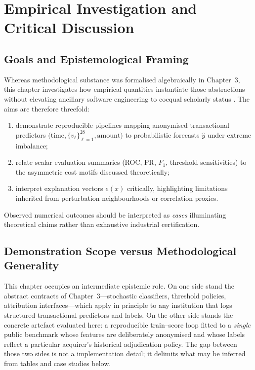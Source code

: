 \chapter{Empirical Investigation and Critical Discussion}

\section{Goals and Epistemological Framing}
Whereas methodological substance was formalised algebraically in Chapter~3, this chapter investigates how empirical quantities instantiate those abstractions without elevating ancillary software engineering to coequal scholarly status \cite{fraud_handbook,xai_survey}. The aims are therefore threefold:
\begin{enumerate}
    \item demonstrate reproducible pipelines mapping anonymised transactional predictors $\bigl(\mathrm{time}, \{v_{\ell}\}_{\ell=1}^{28},\mathrm{amount}\bigr)$ to probabilistic forecasts $\hat{y}$ under extreme imbalance;
    \item relate scalar evaluation summaries (ROC, PR, $F_1$, threshold sensitivities) to the asymmetric cost motifs discussed theoretically;
    \item interpret explanation vectors $e(x)$ critically, highlighting limitations inherited from perturbation neighbourhoods or correlation proxies.
\end{enumerate}
Observed numerical outcomes should be interpreted as \emph{cases} illuminating theoretical claims rather than exhaustive industrial certification.

\section{Demonstration Scope versus Methodological Generality}
This chapter occupies an intermediate epistemic role. On one side stand the abstract contracts of Chapter~3—stochastic classifiers, threshold policies, attribution interfaces—which apply in principle to any institution that logs structured transactional predictors and labels. On the other side stands the concrete artefact evaluated here: a reproducible train--score loop fitted to a \emph{single} public benchmark whose features are deliberately anonymised and whose labels reflect a particular acquirer’s historical adjudication policy. The gap between those two sides is not a implementation detail; it delimits what may be inferred from tables and case studies below.

